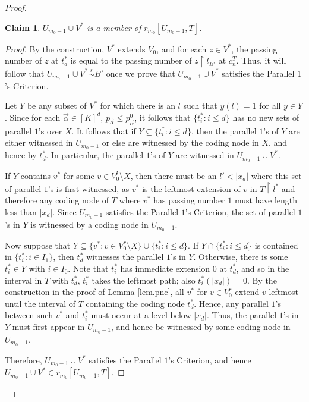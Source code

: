 \documentclass{amsart}
\newtheorem{claim}{Claim}
\theoremstyle{remark}
\theoremstyle{definition}
\theoremstyle{remark}
\newcommand{\al}{\alpha}
\newcommand{\sse}{\subseteq}
\newcommand{\re}{\restriction}
\newcommand{\ssim}{\stackrel{s}{\sim}}
\newcommand{\POC}{Parallel $1$'s Criterion}
\begin{document}
\begin{proof}
\begin{claim}\label{claim.begin}
$U_{m_0-1}\cup V^*$ is a member of $r_{m_0}[U_{m_0-1}, T]$.
\end{claim}



\begin{proof}
By the construction,  $V^*$ extends $V_0$,
and
 for each  $z\in V^*$,
the passing
number of $z$ at $t^*_d$ is equal to the passing number of
$z\re l_{B'}$  at $c^T_{n}$.
Thus,
it will follow that
$U_{m_0-1}\cup V^*\ssim B'$
once we prove that
$U_{m_0-1}\cup V^*$ satisfies the \POC.





Let $Y$ be  any subset of $ V^*$ for which there is an $l$ such that $y(l)=1$ for all $y\in Y$.
Since for each $\vec\al\in [K]^d$, $p_{\vec\al}\le p_{\vec\al}^0$,
it follows that
$\{t^*_i:i\le d\}$ has no new sets of parallel $1$'s over $X$.
It follows that
 if $Y\sse \{t^*_i:i\le d\}$, then the parallel $1$'s of $Y$ are either witnessed in $U_{m_0-1}$ or else are witnessed by the coding node in $X$, and hence by $t^*_d$.
In particular, the parallel $1$'s of $Y$ are witnessed in $U_{m_0-1}\cup V^*$.


If $Y$  contains  $v^*$ for some $v\in V^l_0\setminus X$,
then there must be an $l'< |x_d|$
where this set of parallel $1$'s is first witnessed,
as $v^*$ is the leftmost extension of $v$ in $T\re l^*$ and therefore
any coding node of $T$ where $v^*$ has passing number $1$ must have length less than $|x_d|$.
Since $U_{m_0-1}$ satisfies the \POC,
the set of parallel $1$'s in $Y$ is witnessed by a coding node  in $U_{m_0-1}$.


Now suppose that $Y\sse \{v^*:v\in V^r_0\setminus X\}\cup\{t^*_i:i\le d\}$.
If $Y\cap \{t^*_i:i\le d\}$ is contained in $\{t^*_i:i\in I_1\}$,
then $t^*_d$ witnesses the parallel $1$'s in $Y$.
Otherwise, there is some $t^*_i\in Y$ with $i\in I_0$.
Note that $t^*_i$ has immediate extension $0$ at $t^*_d$, and so in the interval in $T$ with $t^*_d$,
$t^*_i$ takes the leftmost path;
 also $t^*_i(|x_d|)=0$.
By the construction in the proof of Lemma \ref{lem.pnc},
all $v^*$ for $v\in V^r_0$
extend $v$ leftmost until the interval of $T$ containing the coding node  $t^*_d$.
Hence, any parallel $1$'s between such $v^*$ and $t^*_i$ must occur at a level below $|x_d|$.
Thus, the parallel $1$'s in $Y$ must first appear in $U_{m_0-1}$, and hence be witnessed by
 some coding node in $U_{m_0-1}$.


Therefore, $U_{m_0-1}\cup V^*$ satisfies the \POC,
and hence
  $U_{m_0-1}\cup V^*\in r_{m_0}[U_{m_0-1},T]$.
\end{proof}





\end{proof}
\end{document}
